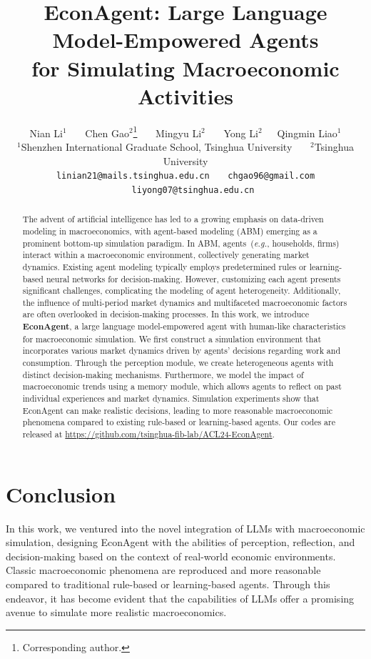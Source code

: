 \documentclass[11pt]{article}
\title{EconAgent: Large Language Model-Empowered Agents\\ for Simulating Macroeconomic Activities}
\author{Nian Li$^1$ \ \ \ Chen Gao$^2$\thanks{Corresponding author.} \ \ \ Mingyu Li$^2$ \ \ \ Yong Li$^2$\footnotemark[1] \ \ \ Qingmin Liao$^1$ \\
$^1$Shenzhen International Graduate School, Tsinghua University \ \ \ $^2$Tsinghua University \\
\small \texttt{linian21@mails.tsinghua.edu.cn} \ \ \ \texttt{chgao96@gmail.com} \ \ \ \texttt{liyong07@tsinghua.edu.cn}
}
\begin{document}
\maketitle
\begin{abstract}
The advent of artificial intelligence has led to a growing emphasis on data-driven modeling in macroeconomics, with agent-based modeling (ABM) emerging as a prominent bottom-up simulation paradigm. In ABM, agents~(\textit{e.g.}, households, firms) interact within a macroeconomic environment, collectively generating market dynamics. 
Existing agent modeling typically employs predetermined rules or learning-based neural networks for decision-making. However, customizing each agent presents significant challenges, complicating the modeling of agent heterogeneity. Additionally, the influence of multi-period market dynamics and multifaceted macroeconomic factors are often overlooked in decision-making processes.
In this work, we introduce \textbf{EconAgent}, a large language model-empowered agent with human-like characteristics for macroeconomic simulation. We first construct a simulation environment that incorporates various market dynamics driven by agents' decisions regarding work and consumption. Through the perception module, we create heterogeneous agents with distinct decision-making mechanisms. Furthermore, we model the impact of macroeconomic trends using a memory module, which allows agents to reflect on past individual experiences and market dynamics.
Simulation experiments show that EconAgent can make realistic decisions, leading to more reasonable macroeconomic phenomena compared to existing rule-based or learning-based agents. Our codes are released at \url{https://github.com/tsinghua-fib-lab/ACL24-EconAgent}.

\end{abstract}








\section{Conclusion}\label{sec::conclusion}
In this work, we ventured into the novel integration of LLMs with macroeconomic simulation, designing EconAgent with the abilities of perception, reflection, and decision-making based on the context of real-world economic environments. Classic macroeconomic phenomena are reproduced and more reasonable compared to traditional rule-based or learning-based agents. Through this endeavor, it has become evident that the capabilities of LLMs offer a promising avenue to simulate more realistic macroeconomics.
\end{document}
